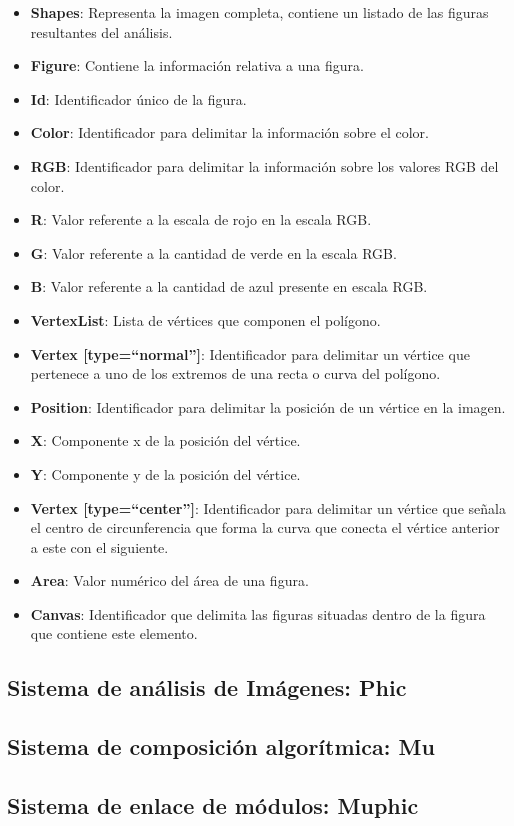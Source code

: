 \begin{itemize}
\item \textbf{Shapes}: Representa la imagen completa, contiene un listado de las figuras resultantes del análisis.
\item \textbf{Figure}: Contiene la información relativa a una figura.
\item \textbf{Id}: Identificador único de la figura.
\item \textbf{Color}: Identificador para delimitar la información sobre el color.
\item \textbf {RGB}: Identificador para delimitar la información sobre los valores RGB del color.
\item \textbf{R}: Valor referente a la escala de rojo en la escala RGB.
\item \textbf{G}: Valor referente a la cantidad de verde en la escala RGB.
\item \textbf{B}: Valor referente a la cantidad de azul presente en escala RGB.
\item \textbf{VertexList}: Lista de vértices que componen el polígono.
\item \textbf{Vertex [type=``normal'']}: Identificador para delimitar un vértice que pertenece a uno de los extremos de una recta o curva del polígono.
\item \textbf{Position}: Identificador para delimitar la posición de un vértice en la imagen.
\item \textbf{X}: Componente x de la posición del vértice.
\item \textbf{Y}: Componente y de la posición del vértice.
\item \textbf{Vertex [type=``center'']}: Identificador para delimitar un vértice que señala el centro de circunferencia que forma la curva que conecta el vértice anterior a este con el siguiente.
\item \textbf{Area}: Valor numérico del área de una figura.
\item \textbf{Canvas}: Identificador que delimita las figuras situadas dentro de la figura que contiene este elemento. 
\end{itemize}

\subsection{Sistema de análisis de Imágenes: Phic}


\subsection{Sistema de composición algorítmica: Mu}


\subsection{Sistema de enlace de módulos: Muphic}


